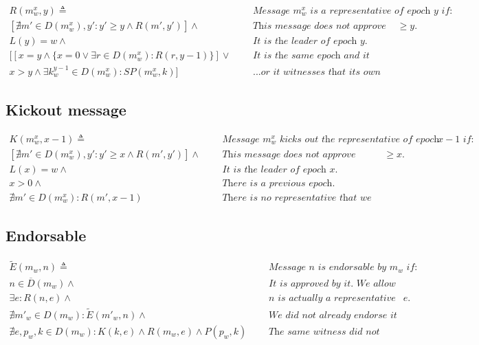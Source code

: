 \documentclass{article}
\begin{document}
    \[
        \begin{aligned}
            R(m_w^x, y) \triangleq& \text{   } &\textit{Message $m_w^x$ is a representative of epoch $y$ if: } \\
            [\nexists m'\in D(m_w^x), y': y'\geq y \land R(m', y') ] \land & & \textit{This message does not approve representative with epoch $\geq y$.} \\
            L(y) = w \land & & \textit{It is the leader of epoch $y$. } \\
            [[ x=y \land \{ x = 0 \lor \exists r\in D(m_w^x) : R(r, y-1)\} ] \lor & & \textit{It is the same epoch and it approves the prev representative if it is not zero epoch} \\
            x>y\land \exists k_w^{y-1}\in D(m_w^x): SP(m_w^x, k) ] & & \textit{...or it witnesses that its own kickout has enough promises.}
        \end{aligned}
    \]

    \subsection*{Kickout message}
    \[
        \begin{aligned}
            K(m_w^x, x-1) \triangleq& \text{   } &\textit{Message $m_w^x$ kicks out the representative of epoch $x-1$ if: } \\
            [\nexists m'\in D(m_w^x), y': y'\geq x \land R(m', y') ] \land & & \textit{This message does not approve representative with epoch $\geq x$.} \\
            L(x) = w \land & & \textit{It is the leader of epoch $x$. } \\
            x > 0 \land & & \textit{There is a previous epoch.} \\
            \nexists m'\in D(m_w^x): R(m', x-1) & & \textit{There is no representative that we are kicking out.}
        \end{aligned}
    \]

    \subsection*{Endorsable}
    \[
        \begin{aligned}
            \widetilde{E}(m_w, n)  \triangleq & \text{   } &\textit{Message $n$ is endorsable by $m_w$ if: } \\
            n \in \overline{D}(m_w) \land & & \textit{It is approved by it. We allow representative to endorse itself.} \\
            \exists e: R(n,e) \land & & \textit{$n$ is actually a representative of some epoch $e$.} \\
            \nexists m'_w \in D(m_w): \widetilde{E}(m'_w, n) \land && \textit{We did not already endorse it with some other message.} \\
            \nexists e,p_w, k\in D(m_w): K(k, e)\land R(m_w, e)\land P(p_w, k) & & \textit{The same witness did not already promise to kickout the very same epoch.}
        \end{aligned}
    \]
\end{document}
